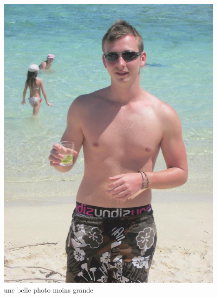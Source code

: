 \documentclass[11pt,a4paper]{article}
\begin{document}
\begin{figure}
	\centering
	\includegraphics[width=\linewidth]{photo.jpg}
	\caption{une belle photo moins grande}
	\label{fig:not_big_photo}
\end{figure}
\end{document}
